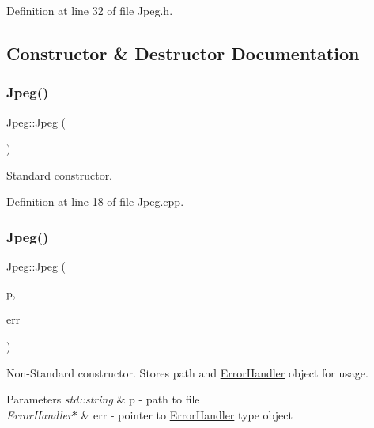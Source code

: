 Definition at line 32 of file Jpeg.\+h.



\subsection{Constructor \& Destructor Documentation}
\mbox{\label{classJpeg_aa6712899740d8d3d8789efe83aeeffac}} 
\subsubsection{\texorpdfstring{Jpeg()}{Jpeg()}\hspace{0.1cm}{\footnotesize\ttfamily [1/3]}}
{\footnotesize\ttfamily Jpeg\+::\+Jpeg (\begin{DoxyParamCaption}{ }\end{DoxyParamCaption})}



Standard constructor. 



Definition at line 18 of file Jpeg.\+cpp.

\mbox{\label{classJpeg_a8c226ee5074c5058b96b918b99e4a531}} 
\subsubsection{\texorpdfstring{Jpeg()}{Jpeg()}\hspace{0.1cm}{\footnotesize\ttfamily [2/3]}}
{\footnotesize\ttfamily Jpeg\+::\+Jpeg (\begin{DoxyParamCaption}\item[{std\+::string}]{p,  }\item[{\mbox{\hyperlink{classErrorHandler}{Error\+Handler}} $\ast$}]{err }\end{DoxyParamCaption})}



Non-\/\+Standard constructor. Stores path and \mbox{\hyperlink{classErrorHandler}{Error\+Handler}} object for usage. 


\begin{DoxyParams}{Parameters}
{\em std\+::string} & p -\/ path to file \\
\hline
{\em Error\+Handler$\ast$} & err -\/ pointer to \mbox{\hyperlink{classErrorHandler}{Error\+Handler}} type object \\
\hline
\end{DoxyParams}


